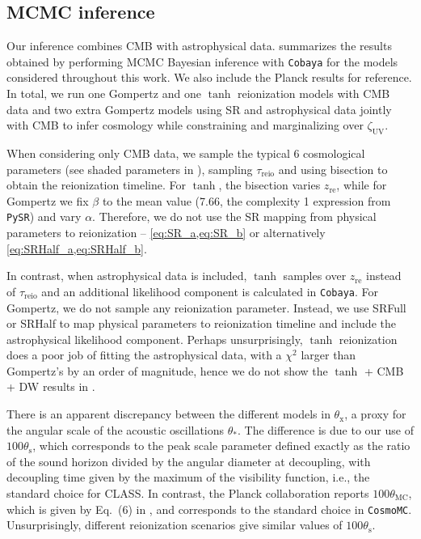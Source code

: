 \documentclass[12pt, a4paper]{article}
\newcommand{\zetaUV}{\zeta_\mathrm{UV}}
\newcommand{\re}{\mathrm{re}}
\newcommand{\reio}{\mathrm{reio}}
\begin{document}
\subsection*{MCMC inference}
\label{sec:fits}

Our inference combines CMB with astrophysical data.
 summarizes the results obtained by performing MCMC
Bayesian inference with \texttt{Cobaya} for the models considered
throughout this work.
We also include the Planck results \cite{Planck2020a} for reference.
In total, we run one Gompertz and one $\tanh$ reionization models with
CMB data and two extra Gompertz models using SR and astrophysical data
jointly with CMB to infer cosmology while constraining and
marginalizing over $\zetaUV$.

When considering only CMB data, we sample the typical 6 cosmological
parameters (see shaded parameters in ), sampling
$\tau_\reio$ and using bisection to obtain the reionization timeline.
For $\tanh$, the bisection varies $z_\re$, while for Gompertz we fix
$\beta$ to the mean value (7.66, the complexity 1 expression from
\texttt{PySR}) and vary $\alpha$.
Therefore, we do not use the SR mapping from physical parameters to
reionization -- \cref{eq:SR_a,eq:SR_b} or alternatively
\cref{eq:SRHalf_a,eq:SRHalf_b}.

In contrast, when astrophysical data is included, $\tanh$ samples over
$z_\re$ instead of $\tau_\reio$ and an additional likelihood component
is calculated in \texttt{Cobaya}.
For Gompertz, we do not sample any reionization parameter.
Instead, we use SRFull or SRHalf to map physical parameters to
reionization timeline and include the astrophysical likelihood
component.
Perhaps unsurprisingly, $\tanh$ reionization does a poor job of fitting
the astrophysical data, with a $\chi^2$ larger than Gompertz's by an
order of magnitude, hence we do not show the $\tanh$ + CMB + DW results
in .

There is an apparent discrepancy between the different models in
$\theta_\mathrm{x}$, a proxy for the angular scale of the acoustic
oscillations $\theta_*$.
The difference is due to our use of $100\theta_\mathrm{s}$, which
corresponds to the peak scale parameter defined exactly as the ratio of
the sound horizon divided by the angular diameter at decoupling, with
decoupling time given by the maximum of the visibility function, i.e.,
the standard choice for CLASS.
In contrast, the Planck collaboration reports $100\theta_\mathrm{MC}$,
which is given by Eq.~(6) in \cite{Planck2014}, and corresponds to the
standard choice in \texttt{CosmoMC}\cite{Lewis2002}.
Unsurprisingly, different reionization scenarios give similar values of
$100\theta_\mathrm{s}$.
\end{document}
